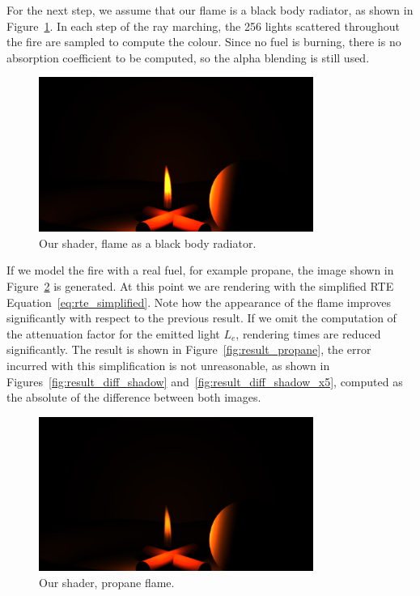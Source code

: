 For the next step, we assume that our flame is a black body radiator, as shown in Figure~\ref{fig:result_blackbody}.
In each step of the ray marching, the 256 lights scattered throughout the fire are sampled to compute the colour.
Since no fuel is burning, there is no absorption coefficient to be computed, so the alpha blending is still used.

\begin{figure}[htbp]
	\centering
	\includegraphics[width=0.8\textwidth, trim={8cm 0 8cm 10cm}, clip]{img/result_blackbody}
	\caption{Our shader, flame as a black body radiator.}
	\label{fig:result_blackbody}
\end{figure}

If we model the fire with a real fuel, for example propane, the image shown in Figure~\ref{fig:result_propane_shadows} is generated.
At this point we are rendering with the simplified RTE Equation~\ref{eq:rte_simplified}.
Note how the appearance of the flame improves significantly with respect to the previous result.
If we omit the computation of the attenuation factor for the emitted light $L_e$, rendering times are reduced significantly.
The result is shown in Figure~\ref{fig:result_propane}, the error incurred with this simplification is not unreasonable, as shown in Figures~\ref{fig:result_diff_shadow} and~\ref{fig:result_diff_shadow_x5}, computed as the absolute of the difference between both images.

\begin{figure}[htbp]
	\centering
	\includegraphics[width=0.8\textwidth, trim={8cm 0 8cm 10cm}, clip]{img/result_propane_shadows}
	\caption{Our shader, propane flame.}
	\label{fig:result_propane_shadows}
\end{figure}

